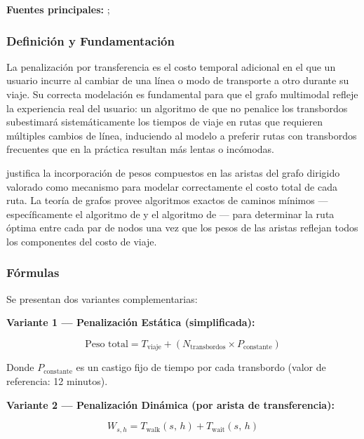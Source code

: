 \textbf{Fuentes principales:} \citet{allauca2023};
\citet{aldous2019optimal}
 
\subsubsection{Definición y Fundamentación}
 
La penalización por transferencia es el costo temporal adicional en el que un
usuario
incurre al cambiar de una línea o modo de transporte a otro durante su viaje. Su
correcta modelación es fundamental para que el grafo multimodal refleje la
experiencia real del usuario: un algoritmo de \dijkstra{} que no penalice los
transbordos subestimará sistemáticamente los tiempos de viaje en rutas que
requieren múltiples cambios de línea, induciendo al modelo a preferir rutas con
transbordos frecuentes que en la práctica resultan más lentas o incómodas.
 
\citet{allauca2023} justifica la incorporación de pesos compuestos en las
aristas
del grafo dirigido valorado como mecanismo para modelar correctamente el costo
total de cada ruta. La teoría de grafos provee algoritmos exactos de caminos
mínimos ---específicamente el algoritmo de \dijkstra{} y el algoritmo de
\floyd{}--- para determinar la ruta óptima entre cada par de nodos una vez que
los
pesos de las aristas reflejan todos los componentes del costo de viaje.
 
\subsubsection{Fórmulas}
 
Se presentan dos variantes complementarias:
 
\medskip
\noindent\textbf{Variante 1 --- Penalización Estática (simplificada):}
 
\begin{equation}
    \text{Peso total} = T_{\text{viaje}} + \left(N_{\text{transbordos}}
    \times P_{\text{constante}}\right)
    \label{eq:penalizacion-estatica}
\end{equation}
 
Donde $P_{\text{constante}}$ es un castigo fijo de tiempo por cada transbordo
(valor de referencia: 12 minutos).
 
\medskip
\noindent\textbf{Variante 2 --- Penalización Dinámica (por arista de transferencia):}
 
\begin{equation}
    W_{s,h} = T_{\text{walk}}(s,\, h) + T_{\text{wait}}(s,\, h)
    \label{eq:penalizacion-dinamica}
\end{equation}
 
